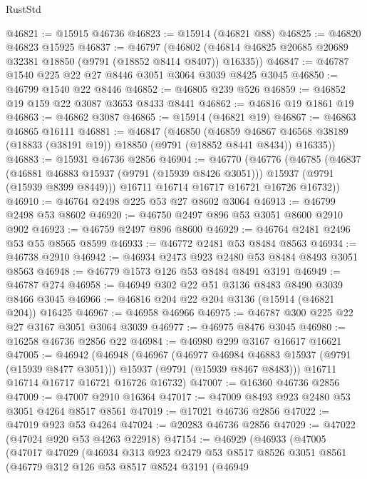 \begin{lexlean}{RustStd}
\begin{coremodule}
@46821 := @15915 @46736
@46823 := @15914 (@46821 @88)
@46825 := @46820 @46823 @15925
@46837 := @46797
    (@46802 (@46814 @46825 @20685 @20689 @32381 @18850 (@9791 (@18852 @8414 @8407)) @16335))
@46847 := @46787 @1540 @225 @22 @27 @8446 @3051 @3064 @3039 @8425 @3045
@46850 := @46799 @1540 @22 @8446
@46852 := @46805 @239 @526
@46859 := @46852 @19 @159 @22 @3087 @3653 @8433 @8441
@46862 := @46816 @19 @1861 @19
@46863 := @46862 @3087
@46865 := @15914 (@46821 @19)
@46867 := @46863 @46865 @16111
@46881 := @46847
    (@46850
      (@46859
        @46867
        @46568
        @38189
        (@18833 (@38191 @19))
        @18850
        (@9791 (@18852 @8441 @8434))
        @16335))
@46883 := @15931 @46736 @2856
@46904 := @46770
    (@46776
      (@46785
        (@46837
          (@46881 @46883 @15937 (@9791 (@15939 @8426 @3051)))
          @15937
          (@9791 (@15939 @8399 @8449)))
        @16711
        @16714
        @16717
        @16721
        @16726
        @16732))
@46910 := @46764 @2498 @225 @53 @27 @8602 @3064
@46913 := @46799 @2498 @53 @8602
@46920 := @46750 @2497 @896 @53 @3051 @8600 @2910 @902
@46923 := @46759 @2497 @896 @8600
@46929 := @46764 @2481 @2496 @53 @55 @8565 @8599
@46933 := @46772 @2481 @53 @8484 @8563
@46934 := @46738 @2910
@46942 := @46934 @2473 @923 @2480 @53 @8484 @8493 @3051 @8563
@46948 := @46779 @1573 @126 @53 @8484 @8491 @3191
@46949 := @46787 @274
@46958 := @46949 @302 @22 @51 @3136 @8483 @8490 @3039 @8466 @3045
@46966 := @46816 @204 @22 @204 @3136 (@15914 (@46821 @204)) @16425
@46967 := @46958 @46966
@46975 := @46787 @300 @225 @22 @27 @3167 @3051 @3064 @3039
@46977 := @46975 @8476 @3045
@46980 := @16258 @46736 @2856 @22
@46984 := @46980 @299 @3167 @16617 @16621
@47005 := @46942
    (@46948
      (@46967
        (@46977 @46984 @46883 @15937 (@9791 (@15939 @8477 @3051)))
        @15937
        (@9791 (@15939 @8467 @8483)))
      @16711
      @16714
      @16717
      @16721
      @16726
      @16732)
@47007 := @16360 @46736 @2856
@47009 := @47007 @2910 @16364
@47017 := @47009 @8493 @923 @2480 @53 @3051 @4264 @8517 @8561
@47019 := @17021 @46736 @2856
@47022 := @47019 @923 @53 @4264
@47024 := @20283 @46736 @2856
@47029 := @47022 (@47024 @920 @53 @4263 @22918)
@47154 := @46929
    (@46933
      (@47005
        (@47017
          @47029
          (@46934
            @313
            @923
            @2479
            @53
            @8517
            @8526
            @3051
            @8561
            (@46779
              @312
              @126
              @53
              @8517
              @8524
              @3191
              (@46949

\end{coremodule}
\end{lexlean}
